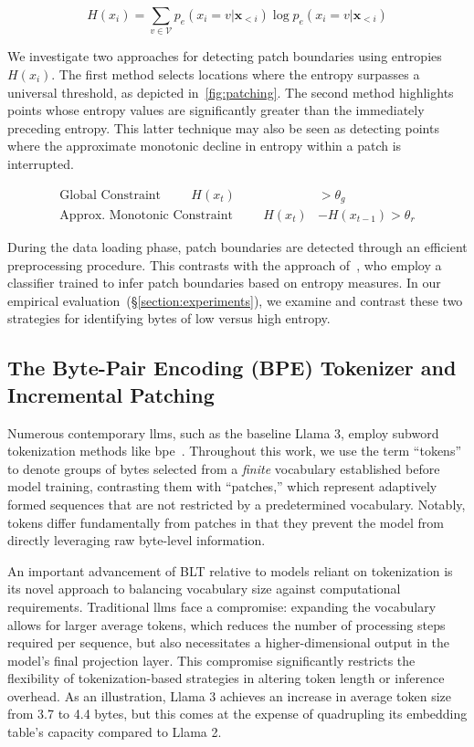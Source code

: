 \begin{equation}
H(x_i) = \sum_{v \in \mathcal{V}} p_{e}(x_i=v|\pmb{x}_{<i}) \log p_{e}(x_i=v|\pmb{x}_{<i})
\end{equation}

We investigate two approaches for detecting patch boundaries using entropies $H(x_i)$. The first method selects locations where the entropy surpasses a universal threshold, as depicted in~\autoref{fig:patching}. The second method highlights points whose entropy values are significantly greater than the immediately preceding entropy. This latter technique may also be seen as detecting points where the approximate monotonic decline in entropy within a patch is interrupted.

\begin{align*}
    \text{Global Constraint}\hspace{1cm}H(x_t)& > \theta_g\\
    \text{Approx. Monotonic Constraint}\hspace{1cm}H(x_t)& - H(x_{t-1}) > \theta_r
\end{align*}

During the data loading phase, patch boundaries are detected through an efficient preprocessing procedure. This contrasts with the approach of~\citet{nawrot-etal-2023-efficient}, who employ a classifier trained to infer patch boundaries based on entropy measures. In our empirical evaluation~(\S\ref{section:experiments}), we examine and contrast these two strategies for identifying bytes of low versus high entropy.

\subsection{The Byte-Pair Encoding (BPE) Tokenizer and Incremental Patching}
\label{section:incremental-patching}
\label{section:bpe-patch}

Numerous contemporary llms, such as the baseline Llama 3, employ subword tokenization methods like bpe~\citep{gage1994new, sennrich-etal-2016-neural}. Throughout this work, we use the term ``tokens'' to denote groups of bytes selected from a \textit{finite} vocabulary established before model training, contrasting them with ``patches,'' which represent adaptively formed sequences that are not restricted by a predetermined vocabulary. Notably, tokens differ fundamentally from patches in that they prevent the model from directly leveraging raw byte-level information.

An important advancement of {\textsc BLT} relative to models reliant on tokenization is its novel approach to balancing vocabulary size against computational requirements. Traditional llms face a compromise: expanding the vocabulary allows for larger average tokens, which reduces the number of processing steps required per sequence, but also necessitates a higher-dimensional output in the model's final projection layer. This compromise significantly restricts the flexibility of tokenization-based strategies in altering token length or inference overhead. As an illustration, Llama 3 achieves an increase in average token size from 3.7 to 4.4 bytes, but this comes at the expense of quadrupling its embedding table’s capacity compared to Llama 2.

